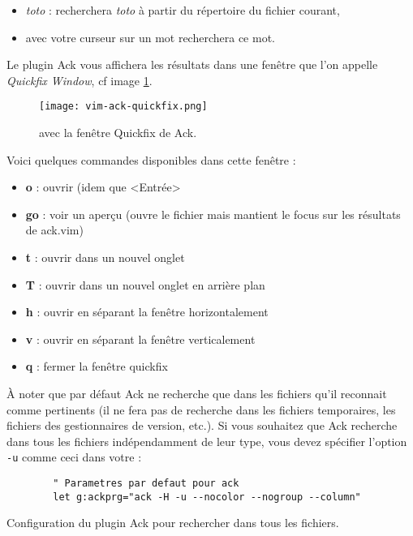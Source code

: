 \begin{itemize}
    \item {} \emph{toto} : recherchera \emph{toto} à partir du répertoire du fichier courant,
    \item {} avec votre curseur sur un mot recherchera ce mot.
\end{itemize}

\bigskip

Le plugin Ack vous affichera les résultats dans une fenêtre que l'on appelle \emph{Quickfix Window}, cf image \ref{fig:vim-ack-quickfix}.

\begin{figure}%
  \texttt{[image: vim-ack-quickfix.png]}
  \caption{\vim avec la fenêtre Quickfix de Ack.}
  \label{fig:vim-ack-quickfix}
\end{figure}


Voici quelques commandes disponibles dans cette fenêtre :

\begin{itemize}
    \item \textbf{o} : ouvrir (idem que <Entrée>
    \item \textbf{go} : voir un aperçu (ouvre le fichier mais mantient le focus sur les résultats de ack.vim)
    \item \textbf{t} : ouvrir dans un nouvel onglet
    \item \textbf{T} : ouvrir dans un nouvel onglet en arrière plan
    \item \textbf{h} : ouvrir en séparant la fenêtre horizontalement
    \item \textbf{v} : ouvrir en séparant la fenêtre verticalement
    \item \textbf{q} : fermer la fenêtre quickfix
\end{itemize}

\bigskip

À noter que par défaut Ack ne recherche que dans les fichiers qu'il reconnait comme pertinents (il ne fera pas de recherche dans les fichiers temporaires, les fichiers des gestionnaires de version, etc.). Si vous souhaitez que Ack recherche dans tous les fichiers indépendamment de leur type, vous devez spécifier l'option \Verb|-u| comme ceci dans votre \vimrc :

\begin{listing}[H]

    \begin{verbatim}
        " Parametres par defaut pour ack
        let g:ackprg="ack -H -u --nocolor --nogroup --column"
    \end{verbatim}
    \caption{Configuration du plugin Ack pour rechercher dans tous les fichiers.}
    \label{code:leader}
\end{listing}

